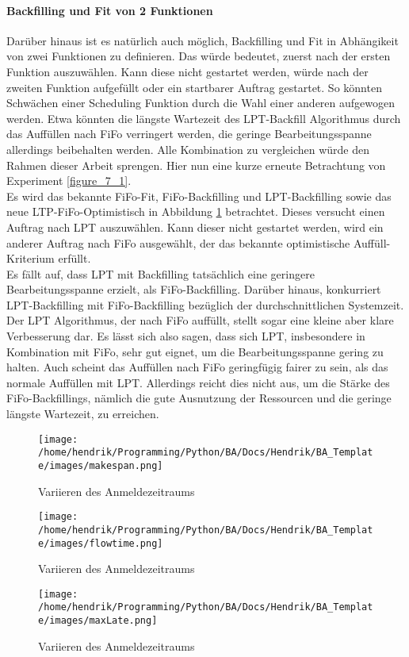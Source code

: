 \FloatBarrier

\paragraph{Backfilling und Fit von 2 Funktionen} Darüber hinaus ist es natürlich auch möglich, Backfilling und Fit in Abhängikeit von zwei Funktionen zu definieren. Das würde bedeutet, zuerst nach der ersten Funktion auszuwählen. Kann diese nicht gestartet werden, würde nach der zweiten Funktion aufgefüllt oder ein startbarer Auftrag gestartet. So könnten Schwächen einer Scheduling Funktion durch die Wahl einer anderen aufgewogen werden. Etwa könnten die längste Wartezeit des LPT-Backfill Algorithmus durch das Auffüllen nach FiFo verringert werden, die geringe Bearbeitungsspanne allerdings beibehalten werden. Alle Kombination zu vergleichen würde den Rahmen dieser Arbeit sprengen. Hier nun eine kurze erneute Betrachtung von Experiment \ref{figure_7_1}.\\
Es wird das bekannte FiFo-Fit, FiFo-Backfilling und LPT-Backfilling sowie das neue LTP-FiFo-Optimistisch in Abbildung \ref{figure_makespan} betrachtet. Dieses versucht einen Auftrag nach LPT auszuwählen. Kann dieser nicht gestartet werden, wird ein anderer Auftrag nach FiFo ausgewählt, der das bekannte optimistische Auffüll-Kriterium erfüllt.\\
Es fällt auf, dass LPT mit Backfilling tatsächlich eine geringere Bearbeitungsspanne erzielt, als FiFo-Backfilling. Darüber hinaus, konkurriert LPT-Backfilling mit FiFo-Backfilling bezüglich der durchschnittlichen Systemzeit. Der LPT Algorithmus, der nach FiFo auffüllt, stellt sogar eine kleine aber klare Verbesserung dar. Es lässt sich also sagen, dass sich LPT, insbesondere in Kombination mit FiFo, sehr gut eignet, um die Bearbeitungsspanne gering zu halten. Auch scheint das Auffüllen nach FiFo geringfügig fairer zu sein, als das normale Auffüllen mit LPT. Allerdings reicht dies nicht aus, um die Stärke des FiFo-Backfillings, nämlich die gute Ausnutzung der Ressourcen und die geringe längste Wartezeit, zu erreichen.
\begin{figure}	
	\texttt{[image: /home/hendrik/Programming/Python/BA/Docs/Hendrik/BA\_Template/images/makespan.png]}
	\caption{Variieren des Anmeldezeitraums}
	\label{figure_makespan}
\end{figure}
\begin{figure}	
	\texttt{[image: /home/hendrik/Programming/Python/BA/Docs/Hendrik/BA\_Template/images/flowtime.png]}
	\caption{Variieren des Anmeldezeitraums}
	\label{figure_flowtime}
\end{figure}
\begin{figure}	
	\texttt{[image: /home/hendrik/Programming/Python/BA/Docs/Hendrik/BA\_Template/images/maxLate.png]}
	\caption{Variieren des Anmeldezeitraums}
	\label{figure_maxLate}
\end{figure}


